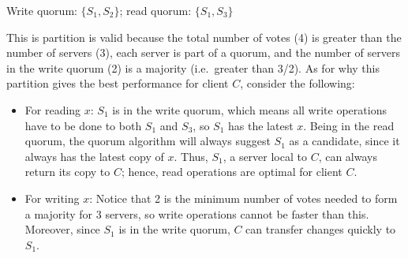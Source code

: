 Write quorum: $\{S_1, S_2\}$; read quorum: $\{S_1,S_3\}$

This is partition is valid because the total number of votes (4) is greater than the number of servers (3), each server is part of a quorum, and the number of servers in the write quorum (2) is a majority (i.e.\ greater than 3/2).
As for why this partition gives the best performance for client $C$, consider the following:
\begin{itemize}
\item
For reading $x$:
$S_1$ is in the write quorum, which means all write operations have to be done to both $S_1$ and $S_3$, so $S_1$ has the latest $x$.
Being in the read quorum, the quorum algorithm will always suggest $S_1$ as a candidate, since it always has the latest copy of $x$.
Thus, $S_1$, a server local to $C$, can always return its copy to $C$;
hence, read operations are optimal for client $C$.
\item
For writing $x$:
Notice that 2 is the minimum number of votes needed to form a majority for 3 servers, so write operations cannot be faster than this.
Moreover, since $S_1$ is in the write quorum, $C$ can transfer changes quickly to $S_1$.
\end{itemize}
